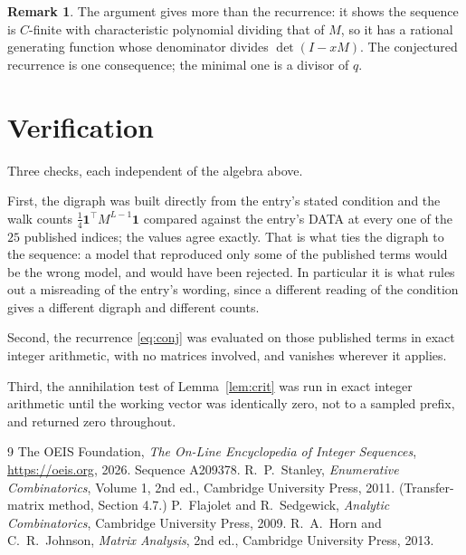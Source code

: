\documentclass[11pt,a4paper]{article}
\theoremstyle{plain}
\theoremstyle{definition}
\newtheorem{remark}[theorem]{Remark}
\begin{document}
\begin{remark}
The argument gives more than the recurrence: it shows the sequence is $C$-finite with
characteristic polynomial dividing that of $M$, so it has a rational generating function
whose denominator divides $\det(I-xM)$. The conjectured recurrence is one consequence; the
minimal one is a divisor of $q$.
\end{remark}

\section{Verification}

Three checks, each independent of the algebra above.

First, the digraph was built directly from the entry's stated condition and the walk counts
$\tfrac1{4}\mathbf{1}^{\!\top}M^{L-1}\mathbf{1}$ compared against the entry's DATA at
every one of the $25$ published indices; the values agree exactly. That is what ties
the digraph to the sequence: a model that reproduced only some of the published terms would
be the wrong model, and would have been rejected. In particular it is what rules out a
misreading of the entry's wording, since a different reading of the condition gives a
different digraph and different counts.

Second, the recurrence \eqref{eq:conj} was evaluated on those published terms in exact
integer arithmetic, with no matrices involved, and vanishes wherever it applies.

Third, the annihilation test of Lemma~\ref{lem:crit} was run in exact integer arithmetic
until the working vector was identically zero, not to a sampled prefix, and returned zero
throughout.

\begin{thebibliography}{9}
 The OEIS Foundation, \emph{The On-Line Encyclopedia of Integer
Sequences}, \url{https://oeis.org}, 2026. Sequence A209378.
 R.~P.~Stanley, \emph{Enumerative Combinatorics}, Volume 1, 2nd ed.,
Cambridge University Press, 2011. (Transfer-matrix method, Section 4.7.)
 P.~Flajolet and R.~Sedgewick, \emph{Analytic Combinatorics}, Cambridge
University Press, 2009.
 R.~A.~Horn and C.~R.~Johnson, \emph{Matrix Analysis}, 2nd ed., Cambridge
University Press, 2013.
\end{thebibliography}
\end{document}
